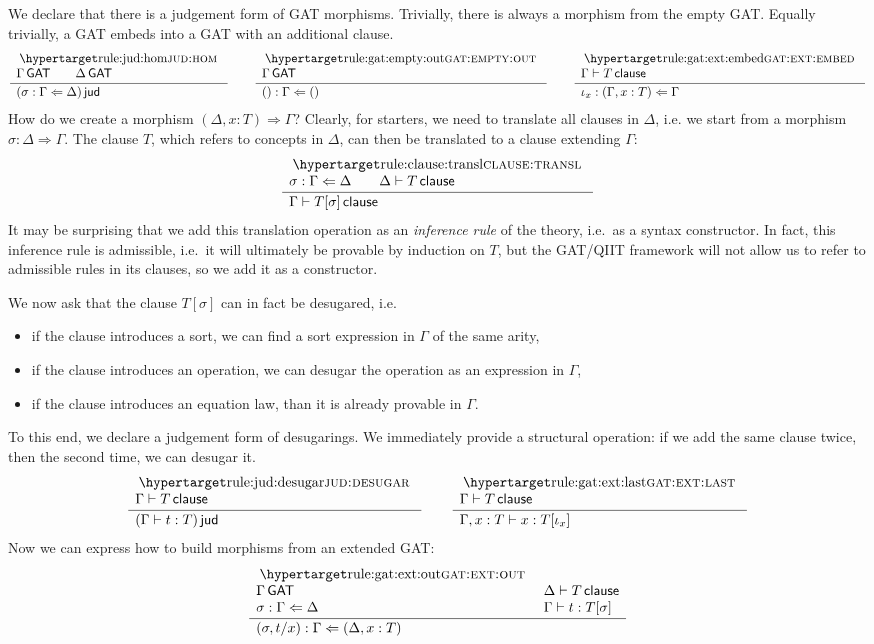 \documentclass[a4paper]{article}
\begin{document}
We declare that there is a judgement form of GAT morphisms.
Trivially, there is always a morphism from the empty GAT.
Equally trivially, a GAT embeds into a GAT with an additional clause.
\[
	\inferencel{jud:hom}{
		\Gamma \GAT \qquad
		\Delta \GAT
	}{
		(\sigma : \Gamma \Leftarrow \Delta) \jud
	}{}
	\qquad
	\inferencel{gat:empty:out}{
		\Gamma \GAT
	}{
		() : \Gamma \Leftarrow ()
	}{}
	\qquad
	\inferencel{gat:ext:embed}{
		\Gamma \sez T \clause
	}{
		\iota_x : (\Gamma, x : T) \Leftarrow \Gamma
	}{}
\]
How do we create
a morphism $(\Delta, x : T) \Rightarrow \Gamma$? Clearly, for starters, we need to translate all clauses in $\Delta$, i.e. we start from a morphism $\sigma : \Delta \Rightarrow \Gamma$.
The clause $T$, which refers to concepts in $\Delta$, can then be translated to a clause extending $\Gamma$:
\[
	\inferencel{clause:transl}{
		\sigma : \Gamma \Leftarrow \Delta \qquad
		\Delta \sez T \clause
	}{
		\Gamma \sez T[\sigma] \clause
	}{}
\]
It may be surprising that we add this translation operation as an \emph{inference rule} of the theory, i.e.\ as a syntax constructor.
In fact, this inference rule is admissible, i.e.\ it will ultimately be provable by induction on $T$, but the GAT/QIIT framework will not allow us to refer to admissible rules in its clauses, so we add it as a constructor.

We now ask that the clause $T[\sigma]$ can in fact be desugared, i.e.
\begin{itemize}[noitemsep]
	\item if the clause introduces a sort, we can find a sort expression in $\Gamma$ of the same arity,
	\item if the clause introduces an operation, we can desugar the operation as an expression in $\Gamma$,
	\item if the clause introduces an equation law, than it is already provable in $\Gamma$.
\end{itemize}
To this end, we declare a judgement form of desugarings.
We immediately provide a structural operation: if we add the same clause twice, then the second time, we can desugar it.
\[
	\inferencel{jud:desugar}{
		\Gamma \sez T \clause
	}{
		(\Gamma \sez t : T) \jud
	}{}
	\qquad
	\inferencel{gat:ext:last}{
		\Gamma \sez T \clause
	}{
		\Gamma, x : T \sez x : T[\iota_x]
	}{}
\]
Now we can express how to build morphisms from an extended GAT:
\[
	\inferencel{gat:ext:out}{
		\Gamma \GAT &
		\Delta \sez T \clause \\
		\sigma : \Gamma \Leftarrow \Delta &
		\Gamma \sez t : T[\sigma]
	}{
		(\sigma, t/x) : \Gamma \Leftarrow (\Delta, x : T)
	}{}
\]
\end{document}
